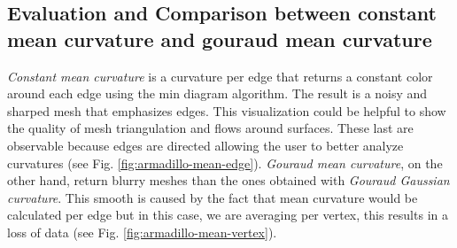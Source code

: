 \subsection{Evaluation and Comparison between constant mean curvature and gouraud mean curvature}
\textit{Constant mean curvature} is a curvature per
edge that returns a constant color around each edge
using the min diagram algorithm. The result is a noisy and sharped mesh that emphasizes edges. This visualization could be helpful to show the quality of mesh triangulation and flows around surfaces. These last are observable because edges are directed allowing the user to better analyze curvatures (see Fig. \ref{fig:armadillo-mean-edge}). \textit{Gouraud mean curvature}, on the other hand, return blurry meshes than the ones obtained with  \textit{Gouraud Gaussian curvature}. This smooth is caused by the fact that mean curvature would be calculated per edge but in this case, we are averaging per vertex, this results in a loss of data (see Fig. \ref{fig:armadillo-mean-vertex}).
